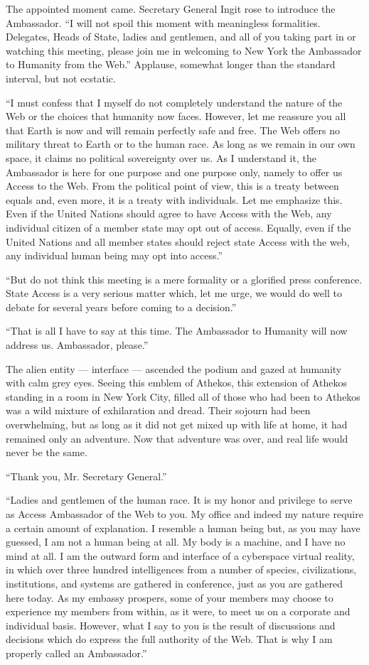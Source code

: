 \documentclass[english,11pt,letterpaper,onecolumn]{scrbook}
\begin{document}
	The appointed moment came.  Secretary General Ingit rose to introduce the Ambassador.  ``I will not spoil this moment with meaningless formalities.  Delegates, Heads of State, ladies and gentlemen, and all of you taking part in or watching this meeting, please join me in welcoming to New York the Ambassador to Humanity from the Web.''  Applause, somewhat longer than the standard interval, but not ecstatic.
	
	``I must confess that I myself do not completely understand the nature of the Web or the choices that humanity now faces.  However, let me reassure you all that Earth is now and will remain perfectly safe and free.  The Web offers no military threat to Earth or to the human race.  As long as we remain in our own space, it claims no political sovereignty over us.  As I understand it, the Ambassador is here for one purpose and one purpose only, namely to offer us Access to the Web.  From the political point of view, this is a treaty between equals and, even more, it is a treaty with individuals.  Let me emphasize this.  Even if the United Nations should agree to have Access with the Web, any individual citizen of a member state may opt out of access.  Equally, even if the United Nations and all member states should reject state Access with the web, any individual human being may opt into access.''
	
	``But do not think this meeting is a mere formality or a glorified press conference.  State Access is a very serious matter which, let me urge, we would do well to debate for several years before coming to a decision.''
	
	``That is all I have to say at this time.  The Ambassador to Humanity will now address us.  Ambassador, please.''
	
	The alien entity --- interface --- ascended the podium and gazed at humanity with calm grey eyes.  Seeing this emblem of Athekos, this extension of Athekos standing in a room in New York City, filled all of those who had been to Athekos was a wild mixture of exhilaration and dread.  Their sojourn had been overwhelming, but as long as it did not get mixed up with life at home, it had remained only an adventure.  Now that adventure was over, and real life would never be the same.
	
	``Thank you, Mr. Secretary General.''
	
	``Ladies and gentlemen of the human race.  It is my honor and privilege to serve as Access Ambassador of the Web to you.  My office and indeed my nature require a certain amount of explanation.  I resemble a human being but, as you may have guessed, I am not a human being at all.  My body is a machine, and I have no mind at all.  I am the outward form and interface of a cyberspace virtual reality, in which over three hundred intelligences from a number of species, civilizations, institutions, and systems are gathered in conference, just as you are gathered here today.  As my embassy prospers, some of your members may choose to experience my members from within, as it were, to meet us on a corporate and individual basis.  However, what I say to you is the result of discussions and decisions which do express the full authority of the Web.  That is why I am properly called an Ambassador.''
	
\end{document}
